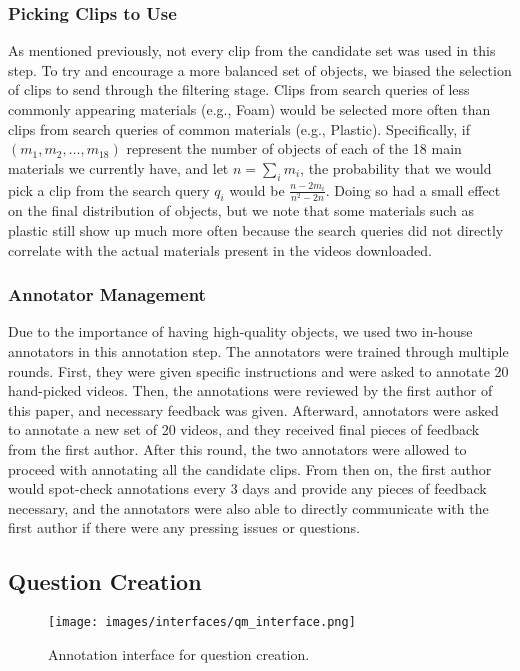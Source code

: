 \documentclass[runningheads]{llncs}
\begin{document}
\subsubsection{Picking Clips to Use}
As mentioned previously, not every clip from the candidate set was used in this step. To try and encourage a more balanced set of objects, we biased the selection of clips to send through the filtering stage. Clips from search queries of less commonly appearing materials (e.g., Foam) would be selected more often than clips from search queries of common materials (e.g., Plastic). Specifically, if $(m_1, m_2, \dots, m_{18})$ represent the number of objects of each of the 18 main materials we currently have, and let $n = \sum_i m_i$, the probability that we would pick a clip from the search query $q_i$ would be $\frac{n-2m_i}{n^2 - 2n}$. Doing so had a small effect on the final distribution of objects, but we note that some materials such as plastic still show up much more often because the search queries did not directly correlate with the actual materials present in the videos downloaded. 

\subsubsection{Annotator Management}

Due to the importance of having high-quality objects, we used two in-house annotators in this annotation step. The annotators were trained through multiple rounds. First, they were given specific instructions and were asked to annotate 20 hand-picked videos. Then, the annotations were reviewed by the first author of this paper, and necessary feedback was given. Afterward, annotators were asked to annotate a new set of 20 videos, and they received final pieces of feedback from the first author. After this round, the two annotators were allowed to proceed with annotating all the candidate clips. From then on, the first author would spot-check annotations every 3 days and provide any pieces of feedback necessary, and the annotators were also able to directly communicate with the first author if there were any pressing issues or questions. 

\subsection{Question Creation}\label{appendix:data3}

\begin{figure}[t]
    \centering
  \texttt{[image: images/interfaces/qm\_interface.png]}
  \caption{Annotation interface for question creation.}
  \label{fig:qm_interface}
\end{figure}
\end{document}
